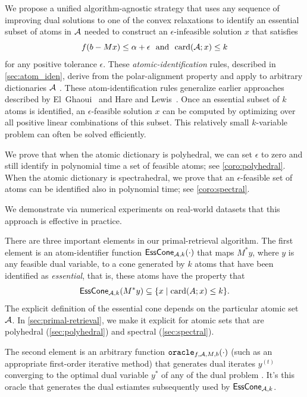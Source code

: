 We propose a unified algorithm-agnostic strategy that uses any sequence of improving dual solutions to one of the convex relaxations to identify an essential subset of atoms in $\mathcal{A}$ needed to construct an $\epsilon$-infeasible solution $x$ that satisfies
\begin{equation} \label{eq:feasible}
    f(b - Mx) \leq \alpha + \epsilon \enspace\mathop{\hbox{\rm and}}\enspace \operatorname{card}(\mathcal{A}; x) \leq k
\end{equation}
for any positive tolerance $\epsilon$. These \emph{atomic-identification} rules, described in \autoref{sec:atom_iden}, derive from the polar-alignment property and apply to arbitrary dictionaries $\mathcal{A}$ \cite{fan2019alignment}. These atom-identification rules generalize earlier approaches described by El~Ghaoui~\cite{Ghaoui12} and Hare and Lewis~\cite{hare2004identifying}. Once an essential subset of $k$ atoms is identified, an $\epsilon$-feasible solution $x$ can be computed by optimizing over all positive linear combinations of this subset. This relatively small $k$-variable problem can often be solved efficiently.

We prove that when the atomic dictionary is polyhedral, we can set $\epsilon$ to zero and still identify in polynomial time a set of feasible atoms; see \autoref{coro:polyhedral}. When the atomic dictionary is spectrahedral, we prove that an $\epsilon$-feasible set of atoms can be identified also in polynomial time; see \autoref{coro:spectral}. 

We demonstrate via numerical experiments on real-world datasets that this approach is effective in practice.

There are three important elements in our primal-retrieval algorithm. The first element is an atom-identifier function $\operatorname{\sf EssCone}_{\mathcal{A}, k}(\cdot)$ that maps $M^*y$, where $y$ is any feasible dual variable, to a cone generated by $k$ atoms that have been identified as \emph{essential}, that is, these atoms have the property that 
\[
  \operatorname{\sf EssCone}_{\mathcal{A}, k}(M^*y) \subseteq \{x \mid \operatorname{card}(A; x) \leq k\}.
\]
The explicit definition of the essential cone depends on the particular atomic set $\mathcal{A}$. In \autoref{sec:primal-retrieval}, we make it explicit for atomic sets that are polyhedral (\autoref{sec:polyhedral}) and spectral (\autoref{sec:spectral}).

The second element is an arbitrary function $\texttt{oracle}_{f,\mathcal{A},M,b}(\cdot)$ (such as an appropriate first-order iterative method) that generates dual iterates $y^{(t)}$ converging to the optimal dual variable $y^*$ of any of the dual problem \Drobi. It's this oracle that generates the dual estiamtes subsequently used by $\operatorname{\sf EssCone}_{\mathcal{A},k}$.

